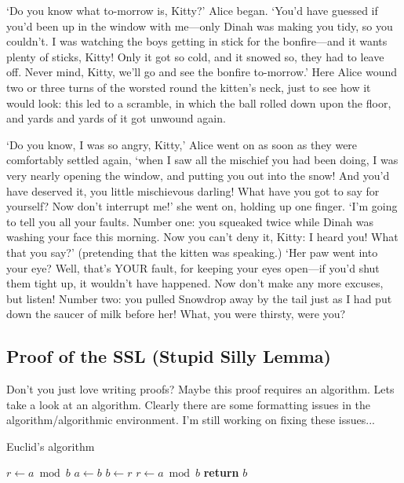 \documentclass[master,tocprelim]{unrthesis}
\renewcommand{\caption}[1]{\singlespacing\hangcaption{#1}\normalspacing}
\begin{document}
\begin{manuscript}
  `Do you know what to-morrow is, Kitty?' Alice began.  `You'd
have guessed if you'd been up in the window with me---only Dinah
was making you tidy, so you couldn't.  I was watching the boys
getting in stick for the bonfire---and it wants plenty of
sticks, Kitty!  Only it got so cold, and it snowed so, they had
to leave off.  Never mind, Kitty, we'll go and see the bonfire
to-morrow.'  Here Alice wound two or three turns of the worsted
round the kitten's neck, just to see how it would look:  this led
to a scramble, in which the ball rolled down upon the floor, and
yards and yards of it got unwound again.

  `Do you know, I was so angry, Kitty,' Alice went on as soon as
they were comfortably settled again, `when I saw all the mischief
you had been doing, I was very nearly opening the window, and
putting you out into the snow!  And you'd have deserved it, you
little mischievous darling!  What have you got to say for
yourself?  Now don't interrupt me!' she went on, holding up one
finger.  `I'm going to tell you all your faults.  Number one:
you squeaked twice while Dinah was washing your face this
morning.  Now you can't deny it, Kitty:  I heard you!  What that
you say?' (pretending that the kitten was speaking.)  `Her paw
went into your eye?  Well, that's YOUR fault, for keeping your
eyes open---if you'd shut them tight up, it wouldn't have
happened.  Now don't make any more excuses, but listen!  Number
two:  you pulled Snowdrop away by the tail just as I had put down
the saucer of milk before her!  What, you were thirsty, were you?

\end{manuscript}

\begin{appendices}

\chapter{Proof of the SSL (Stupid Silly Lemma)}
Don't you just love writing proofs? Maybe this proof requires an algorithm. Lets take a look at an algorithm. Clearly there are some formatting issues in the algorithm/algorithmic environment. I'm still working on fixing these issues...


\begin{algorithm}
    \label{euclid}
    \caption{Euclid’s algorithm}
    \begin{algorithmic}[1]
            \State $r\gets a\bmod b$
            \State $a\gets b$
            \State $b\gets r$
            \State $r\gets a\bmod b$
            \EndWhile\label{euclidendwhile}
            \State \textbf{return} $b$
        \EndProcedure
    \end{algorithmic}
\end{algorithm}

\end{appendices}


\end{document}

